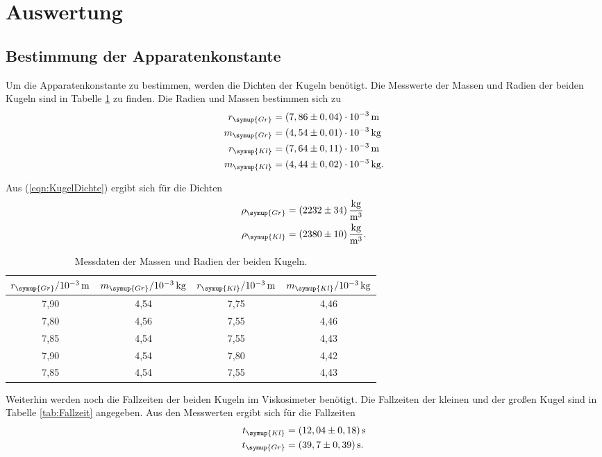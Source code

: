 \section{Auswertung}
\label{sec:Auswertung}

\subsection{Bestimmung der Apparatenkonstante}
\label{sec:Apparatenkonstante}
Um die Apparatenkonstante zu bestimmen, werden die Dichten der Kugeln benötigt.
Die Messwerte der Massen und Radien der beiden Kugeln sind in Tabelle \ref{tab:MasseundDichte} zu finden.
Die Radien und Massen bestimmen sich zu
\begin{align*}
  r_{\symup{Gr}} &= (7,86 \pm 0,04)\cdot 10^{-3} \,\si{\meter}\\
  m_{\symup{Gr}} &= (4,54 \pm 0,01) \cdot 10^{-3} \,\si{\kilo\gram}\\
  r_{\symup{Kl}} &= (7,64 \pm 0,11)\cdot 10^{-3} \,\si{\meter}\\
  m_{\symup{Kl}} &= (4,44 \pm 0,02) \cdot 10^{-3} \,\si{\kilo\gram}.\\
\end{align*}

Aus (\ref{eqn:KugelDichte}) ergibt sich für die Dichten
\begin{align*}
  \rho_{\symup{Gr}} &= (2232 \pm 34) \,\frac{\si{\kg}}{\si{m^3}}  \\
  \rho_{\symup{Kl}} &= (2380 \pm 10) \,\frac{\si{\kg}}{\si{m^3}}. \\
\end{align*}

\begin{table}
  \centering
  \caption{Messdaten der Massen und Radien der beiden Kugeln.}
  \label{tab:MasseundDichte}
  \begin{tabular}{c c c c}
    \toprule
    $r_{\symup{Gr}}/10^{-3}\,\unit{\meter}$ & $m_{\symup{Gr}}/10^{-3}\,\unit{\kilo\gram}$ & $r_{\symup{Kl}}/10^{-3}\,\unit{\meter}$ & $m_{\symup{Kl}}/10^{-3}\,\unit{\kilo\gram}$ \\
    \midrule
    7,90 & 4,54 & 7,75 & 4,46 \\
    7,80 & 4,56 & 7,55 & 4,46 \\
    7,85 & 4,54 & 7,55 & 4,43 \\
    7,90 & 4,54 & 7,80 & 4,42 \\
    7,85 & 4,54 & 7,55 & 4,43 \\
    \bottomrule
  \end{tabular}
\end{table}
Weiterhin werden noch die Fallzeiten der beiden Kugeln im Viskosimeter benötigt.
Die Fallzeiten der kleinen und der großen Kugel sind in Tabelle \ref{tab:Fallzeit} angegeben. Aus den Messwerten ergibt sich für die Fallzeiten
\begin{align*}
  t_{\symup{Kl}} &= (12,04 \pm 0,18)\,\unit{\second} \\
  t_{\symup{Gr}} &= (39,7 \pm 0,39)\,\unit{\second}. \\
\end{align*}

